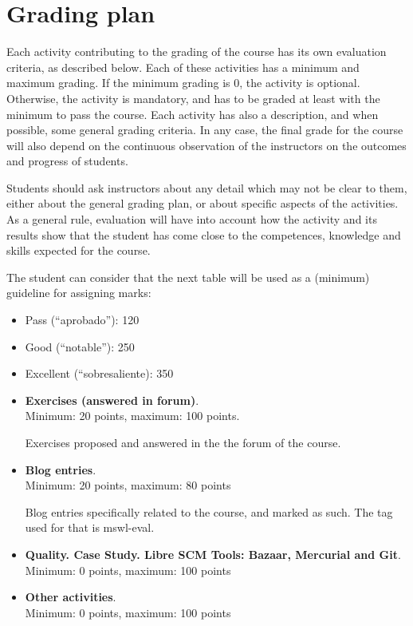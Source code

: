 \documentclass[a4paper]{article}
\begin{document}
\section{Grading plan}

Each activity contributing to the grading of the course has its own evaluation criteria, as described below. Each of these activities has a minimum and maximum grading. If the minimum grading is 0, the activity is optional. Otherwise, the activity is mandatory, and has to be graded at least with the minimum to pass the course. Each activity has also a description, and when possible, some general grading criteria. In any case, the final grade for the course will also depend on the continuous observation of the instructors on the outcomes and progress of students.

Students should ask instructors about any detail which may not be clear to them, either about the general grading plan, or about specific aspects of the activities. As a general rule, evaluation will have into account how the activity and its results show that the student has come close to the competences, knowledge and skills expected for the course.

The student can consider that the next table will be used as a (minimum) guideline for assigning marks:

\begin{itemize}
\item Pass (``aprobado''): 120
\item Good (``notable''): 250
\item Excellent (``sobresaliente): 350
\end{itemize}

\begin{itemize}
\item \textbf{Exercises (answered in forum)}. \\
  Minimum: 20 points, maximum: 100 points.

  Exercises proposed and answered in the the forum of the course.

\item \textbf{Blog entries}. \\
  Minimum: 20 points, maximum: 80 points

  Blog entries specifically related to the course, and marked as such. The tag used for that is mswl-eval.

\item \textbf{Quality. Case Study. Libre SCM Tools: Bazaar, Mercurial and Git}. \\
  Minimum: 0 points, maximum: 100 points

\item \textbf{Other activities}. \\
  Minimum: 0 points, maximum: 100 points

\end{itemize}
\end{document}
